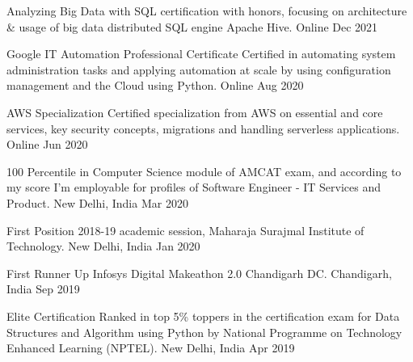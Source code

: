 



\begin{cvhonors}

  \cvhonor
    {Analyzing Big Data with SQL} %
    {certification with honors, focusing on architecture \& usage of big data distributed SQL engine Apache Hive.
} %
    {Online} %
    {Dec 2021} %

  \cvhonor
    {Google IT Automation Professional Certificate} %
    {Certified in automating system administration tasks and  applying automation at scale by using configuration management and the Cloud using Python.
} %
    {Online} %
    {Aug 2020} %

  \cvhonor
    {AWS Specialization} %
    {Certified specialization from AWS on essential and core services, key security concepts, migrations and handling serverless applications.
} %
    {Online} %
    {Jun 2020} %
    
  \cvhonor
    {100 Percentile} %
    {in Computer Science module of AMCAT exam, and according to my score I'm employable for profiles of Software Engineer - IT Services and Product.} %
    {New Delhi, India} %
    {Mar 2020} %

  \cvhonor
    {First Position} %
    {2018-19 academic session, Maharaja Surajmal Institute of Technology.} %
    {New Delhi, India} %
    {Jan 2020} %

  \cvhonor
    {First Runner Up} %
    {Infosys Digital Makeathon 2.0 Chandigarh DC.} %
    {Chandigarh, India} %
    {Sep 2019} %

  \cvhonor
    {Elite Certification} %
    {Ranked in top 5\% toppers in the certification exam for Data Structures and Algorithm using Python by National Programme on Technology Enhanced Learning (NPTEL).} %
    {New Delhi, India} %
    {Apr 2019} %

\end{cvhonors}
